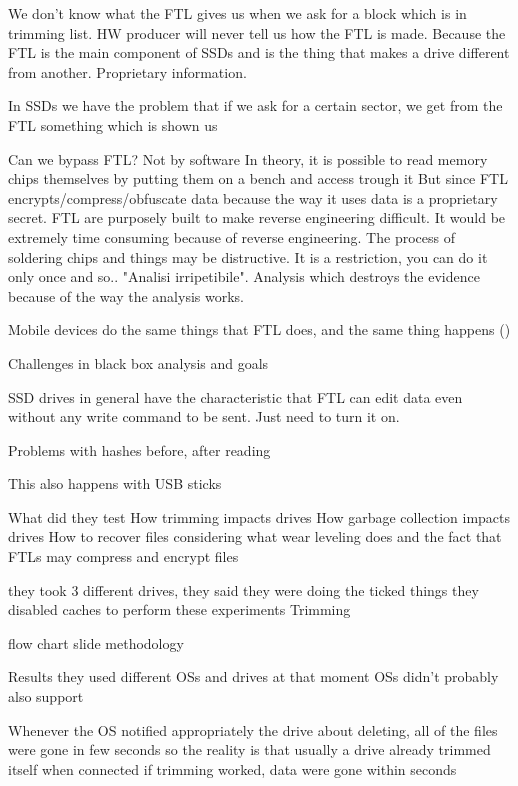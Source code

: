 We don't know what the FTL gives us when we ask for a block which is in trimming list.
HW producer will never tell us how the FTL is made.
Because the FTL is the main component of SSDs and is the thing that makes a drive different from another.
Proprietary information.

In SSDs we have the problem that if we ask for a certain sector, we get from the FTL something which is shown us 

Can we bypass FTL?
    Not by software
    In theory, it is possible to read memory chips themselves by putting them on a bench and access trough it
    But since FTL encrypts/compress/obfuscate data because the way it uses data is a proprietary secret.
    FTL are purposely built to make reverse engineering difficult.
    It would be extremely time consuming because of reverse engineering.
    The process of soldering chips and things may be distructive.
    It is a restriction, you can do it only once and so..
    "Analisi irripetibile". Analysis which destroys the evidence because of the way the analysis works.

    Mobile devices do the same things that FTL does, and the same thing happens ()


Challenges in black box analysis and goals 

    SSD drives in general have the characteristic that FTL can edit data even without any write command to be sent.
    Just need to turn it on.

    Problems with hashes before, after reading 
    
    This also happens with USB sticks 

    
What did they test 
    How trimming impacts drives 
    How garbage collection impacts drives 
    How to recover files considering what wear leveling does and the fact that FTLs may compress and encrypt files 

    they took 3 different drives, they said they were doing the ticked things 
    they disabled caches to perform these experiments
Trimming 

    flow chart slide methodology

Results
    they used different OSs and drives 
    at that moment OSs didn't probably also support 

    Whenever the OS notified appropriately the drive about deleting, all of the files were gone in few seconds
    so the reality is that usually a drive already trimmed itself when connected 
    if trimming worked, data were gone within seconds

